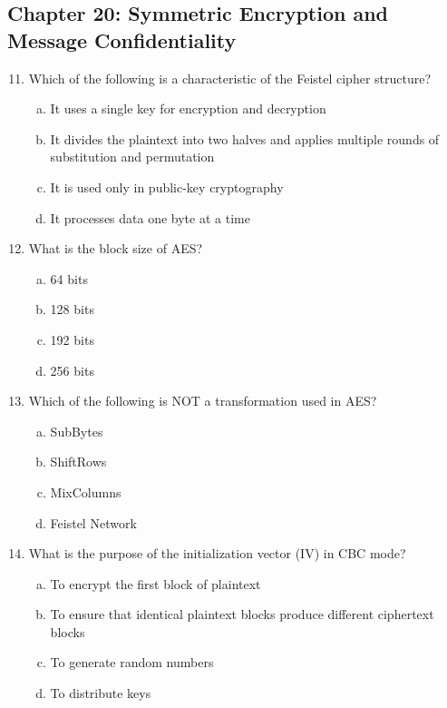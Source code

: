 \documentclass[12pt]{article}
\begin{document}
\subsection*{Chapter 20: Symmetric Encryption and Message Confidentiality}

\begin{enumerate}
    \setcounter{enumi}{10}
    \item Which of the following is a characteristic of the Feistel cipher structure?
    \begin{enumerate}[(a)]
        \item It uses a single key for encryption and decryption
        \item It divides the plaintext into two halves and applies multiple rounds of substitution and permutation
        \item It is used only in public-key cryptography
        \item It processes data one byte at a time
    \end{enumerate}

    \item What is the block size of AES?
    \begin{enumerate}[(a)]
        \item 64 bits
        \item 128 bits
        \item 192 bits
        \item 256 bits
    \end{enumerate}

    \item Which of the following is NOT a transformation used in AES?
    \begin{enumerate}[(a)]
        \item SubBytes
        \item ShiftRows
        \item MixColumns
        \item Feistel Network
    \end{enumerate}

    \item What is the purpose of the initialization vector (IV) in CBC mode?
    \begin{enumerate}[(a)]
        \item To encrypt the first block of plaintext
        \item To ensure that identical plaintext blocks produce different ciphertext blocks
        \item To generate random numbers
        \item To distribute keys
    \end{enumerate}


\end{enumerate}
\end{document}

